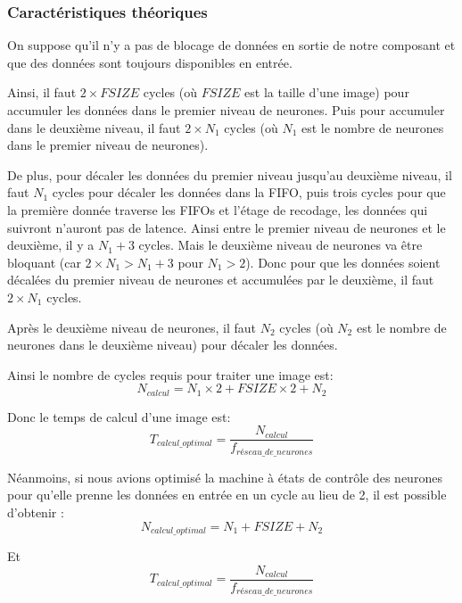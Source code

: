 \subsubsection{Caractéristiques théoriques}

On suppose qu'il n'y a pas de blocage de données en sortie de notre
composant et que des données sont toujours disponibles en entrée.

Ainsi, il faut $2\times FSIZE$ cycles (où $FSIZE$ est la taille d'une image)
pour accumuler les données dans le premier
niveau de neurones. Puis pour accumuler dans le deuxième niveau, il faut
$2\times N_1$ cycles (où $N_1$ est le nombre de neurones dans le premier niveau de
neurones).

De plus, pour décaler les données du premier niveau jusqu'au deuxième
niveau, il faut $N_1$ cycles pour décaler les données dans la FIFO, puis trois cycles
pour que la première donnée traverse les FIFOs et l'étage de recodage, les données
qui suivront n'auront pas de latence. Ainsi entre le premier niveau de neurones
et le deuxième, il y a $N_1 + 3$ cycles.
Mais le deuxième niveau de neurones va être bloquant (car $2\times N_1 > N_1 +3$
pour $N_1 > 2$). Donc pour que les données soient décalées du premier
niveau de neurones et accumulées par le deuxième, il faut $2\times N_1$ cycles.

Après le deuxième niveau de neurones, il faut $N_2$ cycles (où $N_2$
est le nombre de neurones dans le deuxième niveau) pour décaler les données.

Ainsi le nombre de cycles requis pour traiter une image est:
\begin{equation}
	N_{calcul} = N_1 \times 2 + FSIZE \times 2 + N_2
\end{equation}

Donc le temps de calcul d'une image est:
\begin{equation}
	T_{calcul\_optimal} = \frac{N_{calcul}}{f_{réseau\_de\_neurones}}
\end{equation}

Néanmoins, si nous avions optimisé la machine à états de contrôle des neurones pour
qu'elle prenne les données en entrée en un cycle au lieu de 2, il est possible
d'obtenir :
\begin{equation}
	N_{calcul\_optimal} = N_1 + FSIZE + N_2
\end{equation}

Et
\begin{equation}
	T_{calcul\_optimal} = \frac{N_{calcul}}{f_{réseau\_de\_neurones}}
\end{equation}

